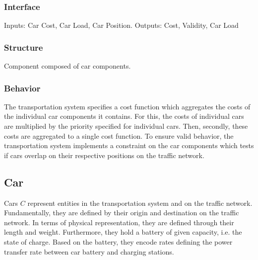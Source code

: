 \subsubsection{Interface}

Inputs: Car Cost, Car Load, Car Position. Outputs: Cost, Validity, Car Load

\subsubsection{Structure}

Component composed of car components.

\subsubsection{Behavior}

The transportation system specifies a cost function which aggregates the costs of the individual car components it contains. For this, the costs of individual cars are multiplied by the priority specified for individual cars. Then, secondly, these costs are aggregated to a single cost function. To ensure valid behavior, the transportation system implements a constraint on the car components which tests if cars overlap on their respective positions on the traffic network.

\subsection{Car}

Cars $C$ represent entities in the transportation system and on the traffic network. Fundamentally, they are defined by their origin and destination on the traffic network. In terms of physical representation, they are defined through their length and weight. Furthermore, they hold a battery of given capacity, i.e. the state of charge. Based on the battery, they encode rates defining the power transfer rate between car battery and charging stations.

